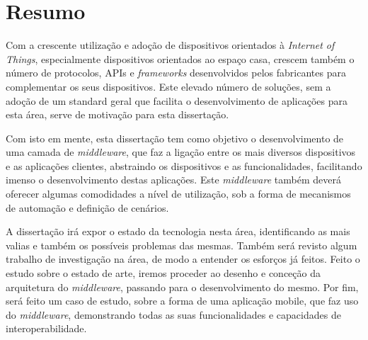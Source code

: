 \chapter*{Resumo}

Com a crescente utilização e adoção de dispositivos orientados à \textit{Internet of Things}, especialmente dispositivos orientados ao espaço casa, crescem também o número de protocolos, APIs e \textit{frameworks} desenvolvidos pelos fabricantes para complementar os seus dispositivos. Este elevado número de soluções, sem a adoção de um standard geral que facilita o desenvolvimento de aplicações para esta área, serve de motivação para esta dissertação.

Com isto em mente, esta dissertação tem como objetivo o desenvolvimento de uma camada de \textit{middleware}, que faz a ligação entre os mais diversos dispositivos e as aplicações clientes, abstraindo os dispositivos e as funcionalidades, facilitando imenso o desenvolvimento destas aplicações. Este \textit{middleware} também deverá oferecer algumas comodidades a nível de utilização, sob a forma de mecanismos de automação e definição de cenários.

A dissertação irá expor o estado da tecnologia nesta área, identificando as mais valias e também os possíveis problemas das mesmas. Também será revisto algum trabalho de investigação na área, de modo a entender os esforços já feitos. Feito o estudo sobre o estado de arte, iremos proceder ao desenho e conceção da arquitetura do \textit{middleware}, passando para o desenvolvimento do mesmo. Por fim, será feito um caso de estudo, sobre a forma de uma aplicação mobile, que faz uso do \textit{middleware}, demonstrando todas as suas funcionalidades e capacidades de interoperabilidade.